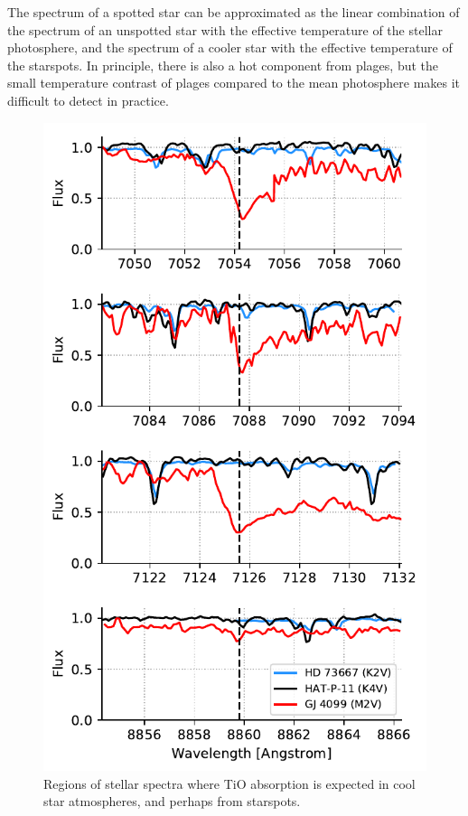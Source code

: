 The spectrum of a spotted star can be approximated as the linear combination of the spectrum of an unspotted star with the effective temperature of the stellar photosphere, and the spectrum of a cooler star with the effective temperature of the starspots. In principle, there is also a hot component from plages, but the small temperature contrast of plages compared to the mean photosphere makes it difficult to detect in practice.


\begin{figure}
    \centering
    \includegraphics[scale=0.9]{freckles/demo.pdf}
    \caption{Regions of stellar spectra where TiO absorption is expected in cool star atmospheres, and perhaps from starspots.}
    \label{fig:demo}
\end{figure}

